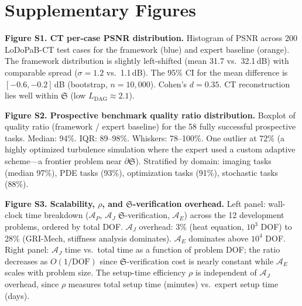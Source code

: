 \documentclass[11pt,a4paper]{article}
\newcommand{\Sclass}{\mathfrak{S}}
\newcommand{\Agent}{\mathcal{A}}
\begin{document}

\section*{Supplementary Figures}

\textbf{Figure S1. CT per-case PSNR distribution.} Histogram of PSNR across 200 LoDoPaB-CT test cases for the framework (blue) and expert baseline (orange). The framework distribution is slightly left-shifted (mean 31.7 vs.\ 32.1\,dB) with comparable spread ($\sigma = 1.2$ vs.\ 1.1\,dB). The 95\% CI for the mean difference is $[-0.6, -0.2]$\,dB (bootstrap, $n = 10{,}000$). Cohen's $d = 0.35$. CT reconstruction lies well within $\Sclass$ (low $L_{\text{DAG}} \approx 2.1$).

\textbf{Figure S2. Prospective benchmark quality ratio distribution.} Boxplot of quality ratio (framework / expert baseline) for the 58 fully successful prospective tasks. Median: 94\%. IQR: 89--98\%. Whiskers: 78--100\%. One outlier at 72\% (a highly optimized turbulence simulation where the expert used a custom adaptive scheme---a frontier problem near $\partial \Sclass$). Stratified by domain: imaging tasks (median 97\%), PDE tasks (93\%), optimization tasks (91\%), stochastic tasks (88\%).

\textbf{Figure S3. Scalability, $\rho$, and $\Sclass$-verification overhead.} Left panel: wall-clock time breakdown ($\Agent_P$, $\Agent_J$ $\Sclass$-verification, $\Agent_E$) across the 12 development problems, ordered by total DOF. $\Agent_J$ overhead: 3\% (heat equation, $10^3$ DOF) to 28\% (GRI-Mech, stiffness analysis dominates). $\Agent_E$ dominates above $10^4$ DOF. Right panel: $\Agent_J$ time vs.\ total time as a function of problem DOF; the ratio decreases as $O(1/\text{DOF})$ since $\Sclass$-verification cost is nearly constant while $\Agent_E$ scales with problem size. The setup-time efficiency $\rho$ is independent of $\Agent_J$ overhead, since $\rho$ measures total setup time (minutes) vs.\ expert setup time (days).

\end{document}
